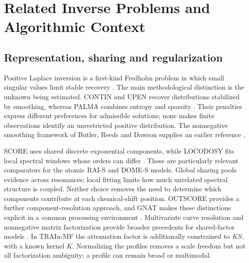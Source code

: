 \section{Related Inverse Problems and Algorithmic Context}\label{sec:related}
\subsection{Representation, sharing and regularization}
Positive Laplace inversion is a first-kind Fredholm problem in which small singular values limit stable recovery \cite{discrete,hansen}. The main methodological distinction is the unknown being estimated. CONTIN and UPEN recover distributions stabilized by smoothing, whereas PALMA combines entropy and sparsity \cite{contin,upen,palma}. Their penalties express different preferences for admissible solutions; none makes finite observations identify an unrestricted positive distribution. The nonnegative smoothing framework of Butler, Reeds and Dawson supplies an earlier reference \cite{brd}.

SCORE uses shared discrete exponential components, while LOCODOSY fits local spectral windows whose orders can differ \cite{score,locodosy}. These are particularly relevant comparators for the atomic RAI-S and DOME-S models. Global sharing pools evidence across resonances; local fitting limits how much unrelated spectral structure is coupled. Neither choice removes the need to determine which components contribute at each chemical-shift position. OUTSCORE provides a further component-resolution approach, and GNAT makes these distinctions explicit in a common processing environment \cite{outscore,gnat}. Multivariate curve resolution and nonnegative matrix factorization provide broader precedents for shared-factor models \cite{mcr,nmf}. In TRAIn-MF the attenuation factor is additionally constrained to $KS$, with a known kernel $K$. Normalizing the profiles removes a scale freedom but not all factorization ambiguity; a profile can remain broad or multimodal.

